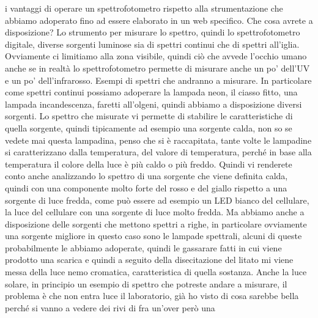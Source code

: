 i vantaggi di operare un spettrofotometro rispetto alla strumentazione che abbiamo adoperato fino ad essere elaborato in un web specifico. Che cosa avrete a disposizione? Lo strumento per misurare lo spettro, quindi lo spettrofotometro digitale, diverse sorgenti luminose sia di spettri continui che di spettri all'iglia. Ovviamente ci limitiamo alla zona visibile, quindi ciò che avvede l'occhio umano anche se in realtà lo spettrofotometro permette di misurare anche un po' dell'UV e un po' dell'infrarosso. Esempi di spettri che andranno a misurare. In particolare come spettri continui possiamo adoperare la lampada neon, il ciasso fitto, una lampada incandescenza, faretti all'olgeni, quindi abbiamo a disposizione diversi sorgenti. Lo spettro che misurate vi permette di stabilire le caratteristiche di quella sorgente, quindi tipicamente ad esempio una sorgente calda, non so se vedete mai questa lampadina, penso che si è raccapitata, tante volte le lampadine si caratterizzano dalla temperatura, del valore di temperatura, perché in base alla temperatura il colore della luce è più caldo o più freddo. Quindi vi renderete conto anche analizzando lo spettro di una sorgente che viene definita calda, quindi con una componente molto forte del rosso e del giallo rispetto a una sorgente di luce fredda, come può essere ad esempio un LED bianco del cellulare, la luce del cellulare con una sorgente di luce molto fredda. Ma abbiamo anche a disposizione delle sorgenti che mettono spettri a righe, in particolare ovviamente una sorgente migliore in questo caso sono le lampade spettrali, alcuni di queste probabilmente le abbiamo adoperate, quindi le gassarare fatti in cui viene prodotto una scarica e quindi a seguito della disecitazione del litato mi viene messa della luce nemo cromatica, caratteristica di quella sostanza. Anche la luce solare, in principio un esempio di spettro che potreste andare a misurare, il problema è che non entra luce il laboratorio, già ho visto di cosa sarebbe bella perché si vanno a vedere dei rivi di fra un'over però una

